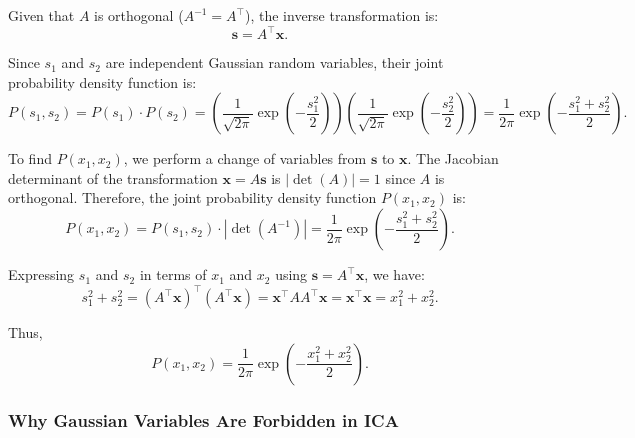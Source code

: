 \documentclass[12pt]{article}
\begin{document}
Given that \( A \) is orthogonal (\( A^{-1} = A^\top \)), the inverse transformation is:
\[
\mathbf{s} = A^\top \mathbf{x}.
\]

Since \( s_1 \) and \( s_2 \) are independent Gaussian random variables, their joint probability density function is:
\[
P(s_1, s_2) = P(s_1) \cdot P(s_2) = \left( \frac{1}{\sqrt{2\pi}} \exp\left( -\frac{s_1^2}{2} \right) \right) \left( \frac{1}{\sqrt{2\pi}} \exp\left( -\frac{s_2^2}{2} \right) \right) = \frac{1}{2\pi} \exp\left( -\frac{s_1^2 + s_2^2}{2} \right).
\]

To find \( P(x_1, x_2) \), we perform a change of variables from \( \mathbf{s} \) to \( \mathbf{x} \). The Jacobian determinant of the transformation \( \mathbf{x} = A \mathbf{s} \) is \( |\det(A)| = 1 \) since \( A \) is orthogonal. Therefore, the joint probability density function \( P(x_1, x_2) \) is:
\[
P(x_1, x_2) = P(s_1, s_2) \cdot |\det(A^{-1})| = \frac{1}{2\pi} \exp\left( -\frac{s_1^2 + s_2^2}{2} \right).
\]

Expressing \( s_1 \) and \( s_2 \) in terms of \( x_1 \) and \( x_2 \) using \( \mathbf{s} = A^\top \mathbf{x} \), we have:
\[
s_1^2 + s_2^2 = (A^\top \mathbf{x})^\top (A^\top \mathbf{x}) = \mathbf{x}^\top A A^\top \mathbf{x} = \mathbf{x}^\top \mathbf{x} = x_1^2 + x_2^2.
\]

Thus,
\[
P(x_1, x_2) = \frac{1}{2\pi} \exp\left( -\frac{x_1^2 + x_2^2}{2} \right).
\]

\subsubsection*{ Why Gaussian Variables Are Forbidden in ICA}
\end{document}
